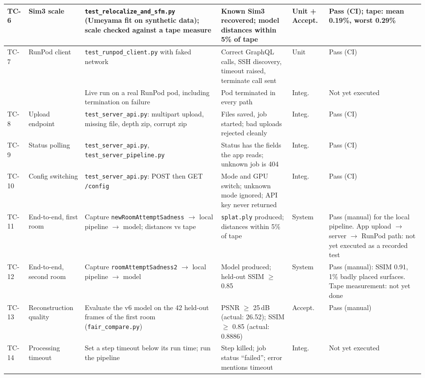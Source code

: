 {\begin{longtable}{p{}p{}p{}p{}p{}p{}}
\midrule
TC-6 & Sim3 scale & \texttt{test\_relocalize\_and\_sfm.py} (Umeyama fit on synthetic data); scale checked against a tape measure & Known Sim3 recovered; model distances within 5\% of tape & Unit + Accept. & Pass (CI); tape: mean 0.19\%, worst 0.29\% \\
\midrule
TC-7 & RunPod client & \texttt{test\_runpod\_client.py} with faked network & Correct GraphQL calls, SSH discovery, timeout raised, terminate call sent & Unit & Pass (CI) \\
& & Live run on a real RunPod pod, including termination on failure & Pod terminated in every path & Integ. & Not yet executed \\
\midrule
TC-8 & Upload endpoint & \texttt{test\_server\_api.py}: multipart upload, missing file, depth zip, corrupt zip & Files saved, job started; bad uploads rejected cleanly & Integ. & Pass (CI) \\
\midrule
TC-9 & Status polling & \texttt{test\_server\_api.py}, \texttt{test\_server\_pipeline.py} & Status has the fields the app reads; unknown job is 404 & Integ. & Pass (CI) \\
\midrule
TC-10 & Config switching & \texttt{test\_server\_api.py}: POST then GET \texttt{/config} & Mode and GPU switch; unknown mode ignored; API key never returned & Integ. & Pass (CI) \\
\midrule
TC-11 & End-to-end, first room & Capture \texttt{newRoomAttemptSadness} $\rightarrow$ local pipeline $\rightarrow$ model; distances vs tape & \texttt{splat.ply} produced; distances within 5\% of tape & System & Pass (manual) for the local pipeline. App upload $\rightarrow$ server $\rightarrow$ RunPod path: not yet executed as a recorded test \\
\midrule
TC-12 & End-to-end, second room & Capture \texttt{roomAttemptSadness2} $\rightarrow$ local pipeline $\rightarrow$ model & Model produced; held-out SSIM $\geq$ 0.85 & System & Pass (manual): SSIM 0.91, 1\% badly placed surfaces. Tape measurement: not yet done \\
\midrule
TC-13 & Reconstruction quality & Evaluate the v6 model on the 42 held-out frames of the first room (\texttt{fair\_compare.py}) & PSNR $\geq$ 25\,dB (actual: 26.52); SSIM $\geq$ 0.85 (actual: 0.8886) & Accept. & Pass (manual) \\
\midrule
TC-14 & Processing timeout & Set a step timeout below its run time; run the pipeline & Step killed; job status ``failed''; error mentions timeout & Integ. & Not yet executed \\
\midrule

\end{longtable}}
